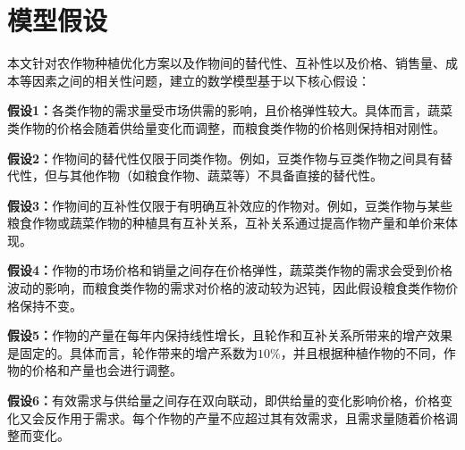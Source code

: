 \chapter[\hspace{0pt}模型假设]{{\heiti{}\hspace{0pt}模型假设}}\label{chapter2:模型假设}

\removelofgap
\removelotgap

本文针对农作物种植优化方案以及作物间的替代性、互补性以及价格、销售量、成本等因素之间的相关性问题，建立的数学模型基于以下核心假设：

\textbf{假设1：}各类作物的需求量受市场供需的影响，且价格弹性较大。具体而言，蔬菜类作物的价格会随着供给量变化而调整，而粮食类作物的价格则保持相对刚性。

\textbf{假设2：}作物间的替代性仅限于同类作物。例如，豆类作物与豆类作物之间具有替代性，但与其他作物（如粮食作物、蔬菜等）不具备直接的替代性。

\textbf{假设3：}作物间的互补性仅限于有明确互补效应的作物对。例如，豆类作物与某些粮食作物或蔬菜作物的种植具有互补关系，互补关系通过提高作物产量和单价来体现。

\textbf{假设4：}作物的市场价格和销量之间存在价格弹性，蔬菜类作物的需求会受到价格波动的影响，而粮食类作物的需求对价格的波动较为迟钝，因此假设粮食类作物价格保持不变。

\textbf{假设5：}作物的产量在每年内保持线性增长，且轮作和互补关系所带来的增产效果是固定的。具体而言，轮作带来的增产系数为$10\%$，并且根据种植作物的不同，作物的价格和产量也会进行调整。

\textbf{假设6：}有效需求与供给量之间存在双向联动，即供给量的变化影响价格，价格变化又会反作用于需求。每个作物的产量不应超过其有效需求，且需求量随着价格调整而变化。